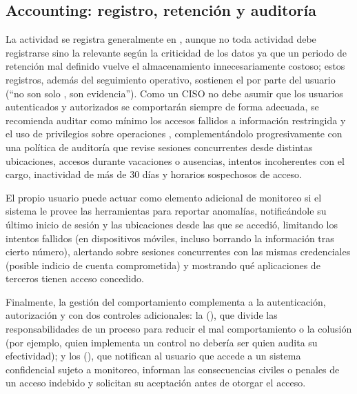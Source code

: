 \subsection*{Accounting: registro, retención y auditoría}

La actividad se registra generalmente en , aunque no toda actividad debe registrarse sino la relevante según la criticidad de los datos ya que un periodo de retención mal definido vuelve el almacenamiento innecesariamente costoso; estos registros, además del seguimiento operativo, sostienen el  por parte del usuario (\enquote{no son solo , son evidencia}). Como un CISO no debe asumir que los usuarios autenticados y autorizados se comportarán siempre de forma adecuada, se recomienda auditar como mínimo los accesos fallidos a información restringida y el uso de privilegios sobre operaciones , complementándolo progresivamente con una política de auditoría que revise sesiones concurrentes desde distintas ubicaciones, accesos durante vacaciones o ausencias, intentos incoherentes con el cargo, inactividad de más de 30 días y horarios sospechosos de acceso.

El propio usuario puede actuar como elemento adicional de monitoreo si el sistema le provee las herramientas para reportar anomalías, notificándole su último inicio de sesión y las ubicaciones desde las que se accedió, limitando los intentos fallidos (en dispositivos móviles, incluso borrando la información tras cierto número), alertando sobre sesiones concurrentes con las mismas credenciales (posible indicio de cuenta comprometida) y mostrando qué aplicaciones de terceros tienen acceso concedido.

Finalmente, la gestión del comportamiento complementa a la autenticación, autorización y  con dos controles adicionales: la  (), que divide las responsabilidades de un proceso para reducir el mal comportamiento o la colusión (por ejemplo, quien implementa un control no debería ser quien audita su efectividad); y los  (), que notifican al usuario que accede a un sistema confidencial sujeto a monitoreo, informan las consecuencias civiles o penales de un acceso indebido y solicitan su aceptación antes de otorgar el acceso.

